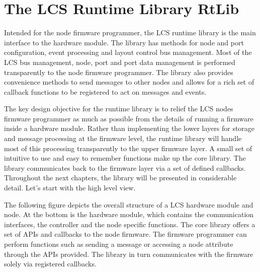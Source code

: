 \chapter{The LCS Runtime Library RtLib}

Intended for the node firmware programmer, the LCS runtime library is the main interface to the hardware module. The library has methods for node and port configuration, event processing and layout control bus management. Most of the LCS bus management, node, port and port data management is performed transparently to the node firmware programmer. The library also provides convenience methods to send messages to other nodes and allows for a rich set of callback functions to be registered to act on messages and events.

The key design objective for the runtime library is to relief the LCS nodes firmware programmer as much as possible from the details of running a firmware inside a hardware module. Rather than implementing the lower layers for storage and message processing at the firmware level, the runtime library will handle most of this processing transparently to the upper firmware layer. A small set of intuitive to use and easy to remember functions make up the core library. The library communicates back to the firmware layer via a set of defined callbacks. Throughout the next chapters, the library will be presented in considerable detail. Let's start with the high level view.

The following figure depicts the overall structure of a LCS hardware module and node. At the bottom is the hardware module, which contains the communication interfaces, the controller and the node specific functions. The core library offers a set of APIs and callbacks to the node firmware. The firmware programmer can perform functions such as sending a message or accessing a node attribute through the APIs provided. The library in turn communicates with the firmware solely via registered callbacks.

